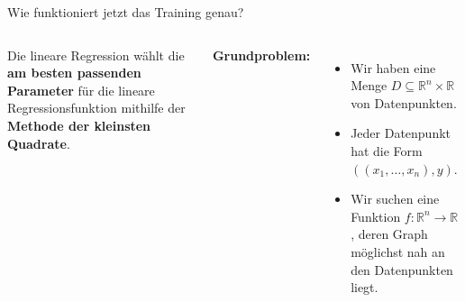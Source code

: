 \begin{frame}{Wie funktioniert jetzt das Training genau?}

\begin{columns}


Die lineare Regression wählt die \textbf{am besten passenden Parameter} für die lineare Regressionsfunktion mithilfe der \textbf{Methode der kleinsten Quadrate}.

\medskip

\textbf{Grundproblem:}
\begin{itemize}
\item Wir haben eine Menge $D \subseteq \mathbb{R}^n \times \mathbb{R}$ von Datenpunkten.
\item Jeder Datenpunkt hat die Form $((x_1, \dots, x_n), y)$.
\item Wir suchen eine Funktion $f: \mathbb{R}^n \to \mathbb{R}$, deren Graph möglichst nah an den Datenpunkten liegt.
\end{itemize}


\end{columns}

\end{frame}

